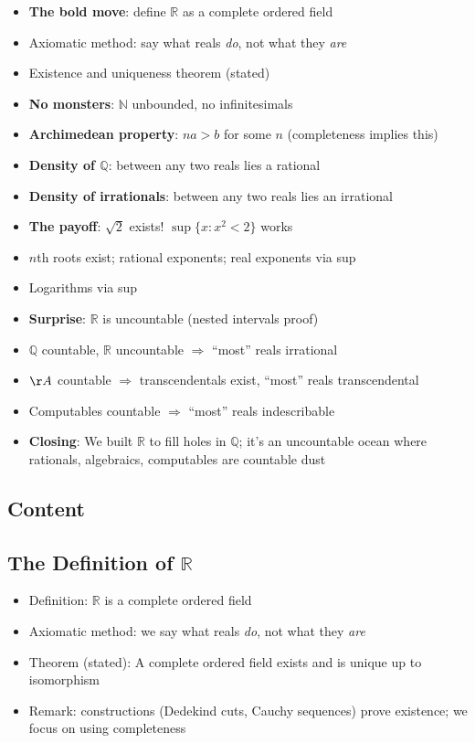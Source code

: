 \documentclass[
  10pt,
  letterpaper,
]{scrbook}
\providecommand{\tightlist}{%
  \setlength{\itemsep}{0pt}\setlength{\parskip}{0pt}}
\newcommand{\NN}{\mathbb{N}}
\newcommand{\QQ}{\mathbb{Q}}
\newcommand{\RR}{\mathbb{R}}
\begin{document}
\begin{itemize}
\tightlist
\item
  \textbf{The bold move}: define \(\RR\) as a complete ordered field
\item
  Axiomatic method: say what reals \emph{do}, not what they \emph{are}
\item
  Existence and uniqueness theorem (stated)
\item
  \textbf{No monsters}: \(\NN\) unbounded, no infinitesimals
\item
  \textbf{Archimedean property}: \(na > b\) for some \(n\) (completeness
  implies this)
\item
  \textbf{Density of \(\QQ\)}: between any two reals lies a rational
\item
  \textbf{Density of irrationals}: between any two reals lies an
  irrational
\item
  \textbf{The payoff}: \(\sqrt{2}\) exists! \(\sup\{x : x^2 < 2\}\)
  works
\item
  \(n\)th roots exist; rational exponents; real exponents via sup
\item
  Logarithms via sup
\item
  \textbf{Surprise}: \(\RR\) is uncountable (nested intervals proof)
\item
  \(\QQ\) countable, \(\RR\) uncountable \(\Rightarrow\) ``most'' reals
  irrational
\item
  \(\AA\) countable \(\Rightarrow\) transcendentals exist, ``most''
  reals transcendental
\item
  Computables countable \(\Rightarrow\) ``most'' reals indescribable
\item
  \textbf{Closing}: We built \(\RR\) to fill holes in \(\QQ\); it's an
  uncountable ocean where rationals, algebraics, computables are
  countable dust
\end{itemize}

\subsection{Content}\label{content-3}

\subsection{\texorpdfstring{The Definition of
\(\RR\)}{The Definition of \textbackslash RR}}\label{the-definition-of-rr}

\begin{itemize}
\tightlist
\item
  Definition: \(\RR\) is a complete ordered field
\item
  Axiomatic method: we say what reals \emph{do}, not what they
  \emph{are}
\item
  Theorem (stated): A complete ordered field exists and is unique up to
  isomorphism
\item
  Remark: constructions (Dedekind cuts, Cauchy sequences) prove
  existence; we focus on using completeness
\end{itemize}
\end{document}
